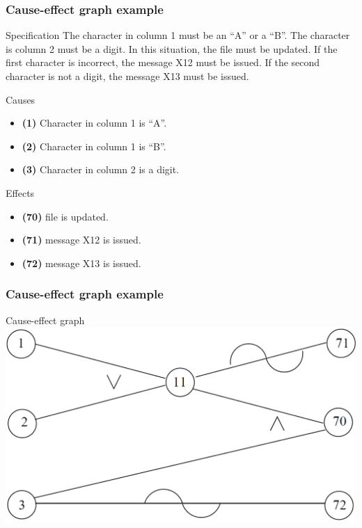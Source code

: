 \begin{frame}[hasprev=false, hasnext=true]
\frametitle{Cause-effect graph example}
\label{example:cause-effect-graph}

\begin{block}{Specification}
The character in column 1 must be an ``A'' or a ``B''. The character is column
2 must be a digit. In this situation, the file must be updated. If the first
character is incorrect, the message X12 must be issued. If the second character
is not a digit, the message X13 must be issued.
\end{block}

\begin{block}{Causes}
\begin{itemize}
	\item \textbf{(1)} Character in column 1 is ``A''.
	\item \textbf{(2)} Character in column 1 is ``B''.
	\item \textbf{(3)} Character in column 2 is a digit.
\end{itemize}
\end{block}

\begin{block}{Effects}
\begin{itemize}
	\item \textbf{(70)} file is updated.
	\item \textbf{(71)} message X12 is issued.
	\item \textbf{(72)} message X13 is issued.
\end{itemize}
\end{block}
\end{frame}



\begin{frame}[hasprev=true, hasnext=true]
\frametitle{Cause-effect graph example}

\begin{block}{Cause-effect graph}
\includegraphics[width=\textwidth]{aux/examples/cause-effect-graph/Cause-effect graph example}
\end{block}

\end{frame}


